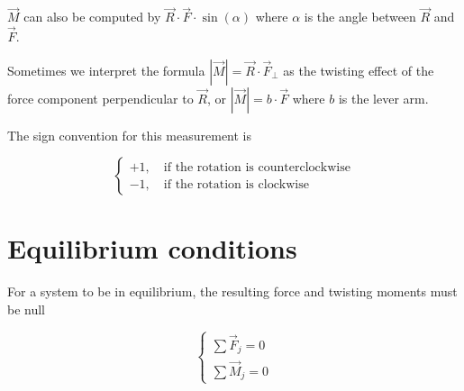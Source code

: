 \documentclass{article}
\begin{document}
\(\vec{M}\) can also be computed by \(\vec{R}\cdot\vec{F}\cdot\sin(\alpha)\) where \(\alpha\)
is the angle between \(\vec{R}\) and \(\vec{F}\).

Sometimes we interpret the formula \(|\vec{M}|=\vec{R}\cdot\vec{F}_\perp\) as
the twisting effect of the force component perpendicular to \(\vec{R}\), or
\(|\vec{M}|=b\cdot\vec{F}\) where \(b\) is the lever arm.

The sign convention for this measurement is

\[
    \begin{cases}
        +1, \quad \text{if the rotation is counterclockwise} \\
        -1, \quad \text{if the rotation is clockwise}
    \end{cases}
\]

\section{Equilibrium conditions }

For a system to be in equilibrium, the resulting force and twisting moments must be null

\[
    \begin{cases}
        \sum \vec{F}_j=0 \\
        \sum \vec{M}_j=0
    \end{cases}
\]
\end{document}
